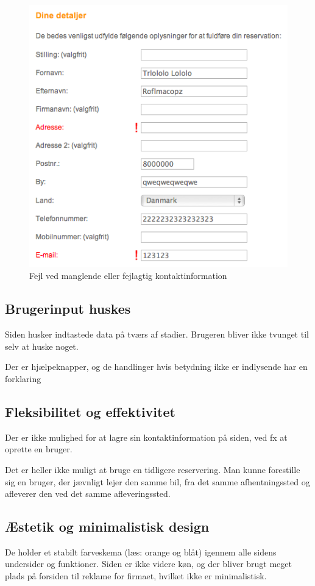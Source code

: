 \documentclass[a4paper]{article}
\begin{document}
\begin{figure}[htbp]
  \begin{center}
    \includegraphics[scale=.6]{8.png}
  \end{center}
  \caption{Fejl ved manglende eller fejlagtig kontaktinformation}
  \label{fejl_kontaktinformation}
\end{figure}


\subsection{Brugerinput huskes}
Siden husker indtastede data på tværs af stadier. Brugeren bliver ikke tvunget
til selv at huske noget.

Der er hjælpeknapper, og de handlinger hvis betydning ikke er indlysende har en
forklaring

\subsection{Fleksibilitet og effektivitet}
Der er ikke mulighed for at lagre sin kontaktinformation på siden, ved fx at
oprette en bruger.

Det er heller ikke muligt at bruge en tidligere reservering. Man kunne
forestille sig en bruger, der jævnligt lejer den samme bil, fra det samme
afhentningssted og afleverer den ved det samme afleveringssted.

\subsection{Æstetik og minimalistisk design}
De holder et stabilt farveskema (læs: orange og blåt) igennem alle sidens
undersider og funktioner. Siden er ikke videre køn, og der bliver brugt meget
plads på forsiden til reklame for firmaet, hvilket ikke er minimalistisk.
\end{document}

